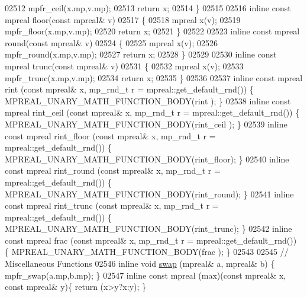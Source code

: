 \begin{DoxyCode}
{{02512     mpfr\_ceil(x.mp,v.mp);
02513     \textcolor{keywordflow}{return} x;
02514 \}
02515 
02516 \textcolor{keyword}{inline} \textcolor{keyword}{const} mpreal floor(\textcolor{keyword}{const} mpreal& v)
02517 \{
02518     mpreal x(v);
02519     mpfr\_floor(x.mp,v.mp);
02520     \textcolor{keywordflow}{return} x;
02521 \}
02522 
02523 \textcolor{keyword}{inline} \textcolor{keyword}{const} mpreal round(\textcolor{keyword}{const} mpreal& v)
02524 \{
02525     mpreal x(v);
02526     mpfr\_round(x.mp,v.mp);
02527     \textcolor{keywordflow}{return} x;
02528 \}
02529 
02530 \textcolor{keyword}{inline} \textcolor{keyword}{const} mpreal trunc(\textcolor{keyword}{const} mpreal& v)
02531 \{
02532     mpreal x(v);
02533     mpfr\_trunc(x.mp,v.mp);
02534     \textcolor{keywordflow}{return} x;
02535 \}
02536 
02537 \textcolor{keyword}{inline} \textcolor{keyword}{const} mpreal rint       (\textcolor{keyword}{const} mpreal& x, mp\_rnd\_t r = mpreal::get\_default\_rnd()) \{   
      MPREAL\_UNARY\_MATH\_FUNCTION\_BODY(rint      );     \}
02538 \textcolor{keyword}{inline} \textcolor{keyword}{const} mpreal rint\_ceil  (\textcolor{keyword}{const} mpreal& x, mp\_rnd\_t r = mpreal::get\_default\_rnd()) \{   
      MPREAL\_UNARY\_MATH\_FUNCTION\_BODY(rint\_ceil );     \}
02539 \textcolor{keyword}{inline} \textcolor{keyword}{const} mpreal rint\_floor (\textcolor{keyword}{const} mpreal& x, mp\_rnd\_t r = mpreal::get\_default\_rnd()) \{   
      MPREAL\_UNARY\_MATH\_FUNCTION\_BODY(rint\_floor);     \}
02540 \textcolor{keyword}{inline} \textcolor{keyword}{const} mpreal rint\_round (\textcolor{keyword}{const} mpreal& x, mp\_rnd\_t r = mpreal::get\_default\_rnd()) \{   
      MPREAL\_UNARY\_MATH\_FUNCTION\_BODY(rint\_round);     \}
02541 \textcolor{keyword}{inline} \textcolor{keyword}{const} mpreal rint\_trunc (\textcolor{keyword}{const} mpreal& x, mp\_rnd\_t r = mpreal::get\_default\_rnd()) \{   
      MPREAL\_UNARY\_MATH\_FUNCTION\_BODY(rint\_trunc);     \}
02542 \textcolor{keyword}{inline} \textcolor{keyword}{const} mpreal frac       (\textcolor{keyword}{const} mpreal& x, mp\_rnd\_t r = mpreal::get\_default\_rnd()) \{   
      MPREAL\_UNARY\_MATH\_FUNCTION\_BODY(frac      );     \}
02543 
02545 \textcolor{comment}{// Miscellaneous Functions}
02546 \textcolor{keyword}{inline} \textcolor{keywordtype}{void}         \hyperlink{endian_8c_a3ca5ecd34b04d6a243c054ac3a57f68d}{swap} (mpreal& a, mpreal& b)            \{    mpfr\_swap(a.mp,b.mp);   \}
02547 \textcolor{keyword}{inline} \textcolor{keyword}{const} mpreal (max)(\textcolor{keyword}{const} mpreal& x, \textcolor{keyword}{const} mpreal& y)\{    \textcolor{keywordflow}{return} (x>y?x:y);       \}
}}
\end{DoxyCode}

